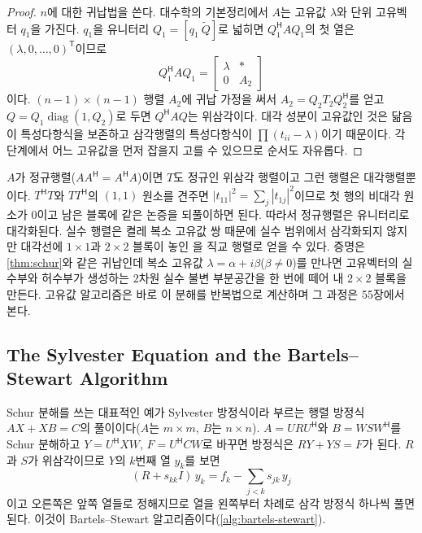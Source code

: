 \begin{proof}
$n$에 대한 귀납법을 쓴다. 대수학의 기본정리에서 $A$는 고유값 $\lambda$와 단위 고유벡터 $q_1$을 가진다. $q_1$을 유니터리 $Q_1=[q_1\ \widetilde Q]$로 넓히면 $Q_1^{\mathsf H}AQ_1$의 첫 열은 $(\lambda,0,\dots,0)^{\mathsf T}$이므로
\[
Q_1^{\mathsf H}AQ_1=\begin{bmatrix}\lambda&*\\0&A_2\end{bmatrix}
\]
이다. $(n-1)\times(n-1)$ 행렬 $A_2$에 귀납 가정을 써서 $A_2=Q_2T_2Q_2^{\mathsf H}$를 얻고 $Q=Q_1\operatorname{diag}(1,Q_2)$로 두면 $Q^{\mathsf H}AQ$는 위삼각이다. 대각 성분이 고유값인 것은 닮음이 특성다항식을 보존하고 삼각행렬의 특성다항식이 $\prod(t_{ii}-\lambda)$이기 때문이다. 각 단계에서 어느 고유값을 먼저 잡을지 고를 수 있으므로 순서도 자유롭다.
\end{proof}

$A$가 정규행렬($AA^{\mathsf H}=A^{\mathsf H}A$)이면 $T$도 정규인 위삼각 행렬이고 그런 행렬은 대각행렬뿐이다. $T^{\mathsf H}T$와 $TT^{\mathsf H}$의 $(1,1)$ 원소를 견주면 $|t_{11}|^2=\sum_j|t_{1j}|^2$이므로 첫 행의 비대각 원소가 $0$이고 남은 블록에 같은 논증을 되풀이하면 된다. 따라서 정규행렬은 유니터리로 대각화된다. 실수 행렬은 켤레 복소 고유값 쌍 때문에 실수 범위에서 삼각화되지 않지만 대각선에 $1\times1$과 $2\times2$ 블록이 놓인 을 직교 행렬로 얻을 수 있다. 증명은 \cref{thm:schur}와 같은 귀납인데 복소 고유값 $\lambda=\alpha+i\beta$($\beta\ne0$)를 만나면 고유벡터의 실수부와 허수부가 생성하는 $2$차원 실수 불변 부분공간을 한 번에 떼어 내 $2\times2$ 블록을 만든다. 고유값 알고리즘은 바로 이 분해를 반복법으로 계산하며 그 과정은 55장에서 본다.

\subsection{The Sylvester Equation and the Bartels--Stewart Algorithm}

Schur 분해를 쓰는 대표적인 예가 Sylvester 방정식이라 부르는 행렬 방정식 $AX+XB=C$의 풀이이다($A$는 $m\times m$, $B$는 $n\times n$). $A=URU^{\mathsf H}$와 $B=WSW^{\mathsf H}$를 Schur 분해하고 $Y=U^{\mathsf H}XW$, $F=U^{\mathsf H}CW$로 바꾸면 방정식은 $RY+YS=F$가 된다. $R$과 $S$가 위삼각이므로 $Y$의 $k$번째 열 $y_k$를 보면
\[
(R+s_{kk}I)\,y_k=f_k-\sum_{j<k}s_{jk}\,y_j
\]
이고 오른쪽은 앞쪽 열들로 정해지므로 열을 왼쪽부터 차례로 삼각 방정식 하나씩 풀면 된다. 이것이 Bartels--Stewart 알고리즘이다\cite{bartels1972stewart}(\cref{alg:bartels-stewart}).


